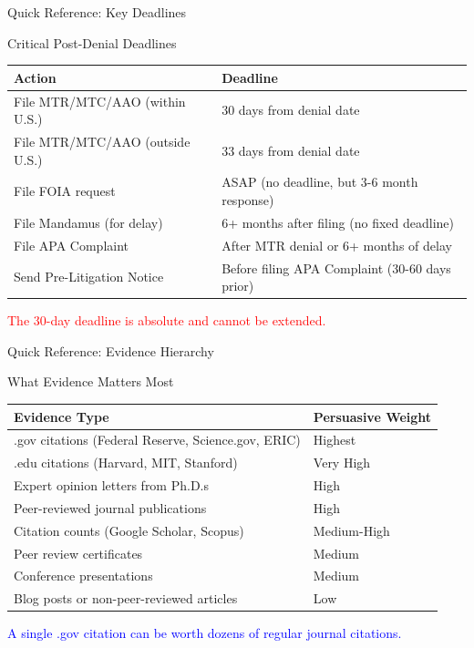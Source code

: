 \documentclass[11pt]{beamer}
\begin{document}
	\begin{frame}{Quick Reference: Key Deadlines}
		\scriptsize
		\begin{block}{Critical Post-Denial Deadlines}
			\centering
			\begin{tabular}{|p{5cm}|p{4cm}|}
				\hline
				\textbf{Action} & \textbf{Deadline} \\
				\hline
				File MTR/MTC/AAO (within U.S.) & 30 days from denial date \\
				\hline
				File MTR/MTC/AAO (outside U.S.) & 33 days from denial date \\
				\hline
				File FOIA request & ASAP (no deadline, but 3-6 month response) \\
				\hline
				File Mandamus (for delay) & 6+ months after filing (no fixed deadline) \\
				\hline
				File APA Complaint & After MTR denial or 6+ months of delay \\
				\hline
				Send Pre-Litigation Notice & Before filing APA Complaint (30-60 days prior) \\
				\hline
			\end{tabular}
			\vspace{0.2cm}
			\textcolor{red}{The 30-day deadline is absolute and cannot be extended.}
		\end{block}
	\end{frame}
	
	\begin{frame}{Quick Reference: Evidence Hierarchy}
		\scriptsize
		\begin{block}{What Evidence Matters Most}
			\centering
			\begin{tabular}{|p{5cm}|p{4cm}|}
				\hline
				\textbf{Evidence Type} & \textbf{Persuasive Weight} \\
				\hline
				.gov citations (Federal Reserve, Science.gov, ERIC) & Highest \\
				\hline
				.edu citations (Harvard, MIT, Stanford) & Very High \\
				\hline
				Expert opinion letters from Ph.D.s & High \\
				\hline
				Peer-reviewed journal publications & High \\
				\hline
				Citation counts (Google Scholar, Scopus) & Medium-High \\
				\hline
				Peer review certificates & Medium \\
				\hline
				Conference presentations & Medium \\
				\hline
				Blog posts or non-peer-reviewed articles & Low \\
				\hline
			\end{tabular}
			\vspace{0.2cm}
			\textcolor{blue}{A single .gov citation can be worth dozens of regular journal citations.}
		\end{block}
	\end{frame}
	
\end{document}
